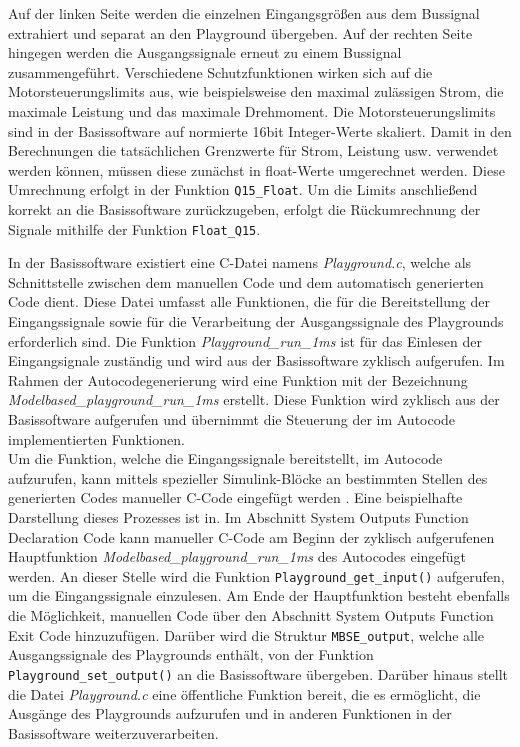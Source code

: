 Auf der linken Seite werden die einzelnen Eingangsgrößen aus dem Bussignal extrahiert und separat an den Playground übergeben. Auf der rechten Seite hingegen werden die Ausgangssignale erneut zu einem Bussignal zusammengeführt. Verschiedene Schutzfunktionen wirken sich auf die Motorsteuerungslimits aus, wie beispielsweise den maximal zulässigen Strom, die maximale Leistung und das maximale Drehmoment. Die Motorsteuerungslimits sind in der Basissoftware auf normierte 16bit Integer-Werte skaliert. Damit in den Berechnungen die tatsächlichen Grenzwerte für Strom, Leistung usw. verwendet werden können, müssen diese zunächst in float-Werte umgerechnet werden. Diese Umrechnung erfolgt in der Funktion \lstinline{Q15_Float}. Um die Limits anschließend korrekt an die Basissoftware zurückzugeben, erfolgt die Rückumrechnung der Signale mithilfe der Funktion \lstinline{Float_Q15}.


In der Basissoftware existiert eine C-Datei namens \textit{Playground.c}, welche als Schnittstelle zwischen dem manuellen Code und dem automatisch generierten Code dient. Diese Datei umfasst alle Funktionen, die für die Bereitstellung der Eingangssignale sowie für die Verarbeitung der Ausgangssignale des Playgrounds erforderlich sind. Die Funktion \textit{Playground\_run\_1ms} ist für das Einlesen der Eingangsignale zuständig und wird aus der Basissoftware zyklisch aufgerufen. 
Im Rahmen der Autocodegenerierung wird eine Funktion mit der Bezeichnung \textit{Modelbased\_playground\_run\_1ms} erstellt. Diese Funktion wird zyklisch aus der Basissoftware aufgerufen und übernimmt die Steuerung der im Autocode implementierten Funktionen.\\ Um die Funktion, welche die Eingangssignale bereitstellt, im Autocode aufzurufen, kann mittels spezieller Simulink-Blöcke an bestimmten Stellen des generierten Codes manueller C-Code eingefügt werden \cite{Matlab_ExternalCode}. Eine beispielhafte Darstellung dieses Prozesses ist in. 
Im Abschnitt \glqq System Outputs Function Declaration Code\grqq{} kann manueller C-Code am Beginn der zyklisch aufgerufenen Hauptfunktion \textit{Modelbased\_playground\_run\_1ms} des Autocodes eingefügt werden. An dieser Stelle wird die Funktion \lstinline{Playground_get_input()} aufgerufen, um die Eingangssignale einzulesen. Am Ende der Hauptfunktion besteht ebenfalls die Möglichkeit, manuellen Code über den Abschnitt \glqq System Outputs Function Exit Code\grqq{} hinzuzufügen. Darüber wird die Struktur \lstinline{MBSE_output}, welche alle Ausgangssignale des Playgrounds enthält, von der Funktion \lstinline{Playground_set_output()} an die Basissoftware übergeben. Darüber hinaus stellt die Datei \textit{Playground.c} eine öffentliche Funktion bereit, die es ermöglicht, die Ausgänge des Playgrounds aufzurufen und in anderen Funktionen in der Basissoftware weiterzuverarbeiten.

